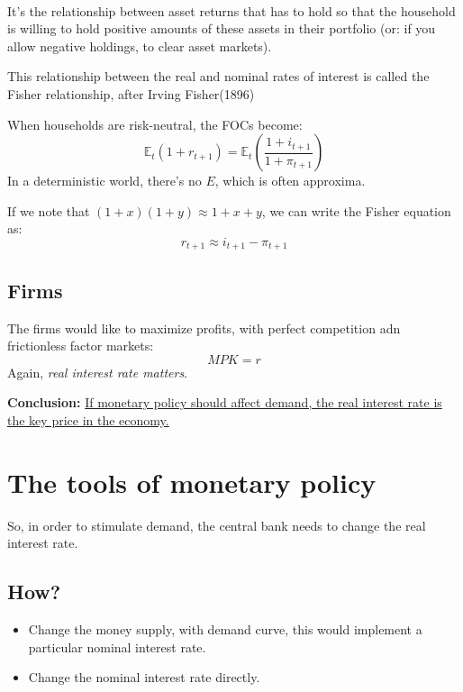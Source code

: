 \begin{corollary}
    \ 

    It's the relationship between asset returns that has to hold 
    so that the household is willing to hold positive amounts 
    of these assets in their portfolio (or: if you allow negative 
    holdings, to clear asset markets).
    
    This relationship between the real and nominal rates of interest is called the Fisher relationship, 
    after Irving Fisher(1896)

    When households are risk-neutral, the FOCs become:
    \[\mathbb{E}_t (1+r_{t+1}) = \mathbb{E}_t \left(\frac{1+i_{t+1}}{1+\pi_{t+1}}\right) \]
    In a deterministic world, there's no $E$, which is often approxima.

    If we note that $(1+x)(1+y) \approx 1+x+y$, we can write the Fisher equation as:
    \[r_{t+1} \approx i_{t+1} - \pi_{t+1} \]
\end{corollary}

\subsection{Firms}
The firms would like to maximize profits, with perfect competition adn frictionless factor markets:
\[MPK = r\]
Again, \textit{real interest rate matters}. 

\textbf{Conclusion:} 
\underline{If monetary policy should affect demand, the real interest rate is the key price in the economy.}



\section{The tools of monetary policy}
So, in order to stimulate demand, the central bank needs to change the real interest rate.

\subsection*{How?}

\begin{itemize}
    \item Change the money supply, with demand curve, this would implement a particular nominal interest rate.
    \item Change the nominal interest rate directly.
\end{itemize}

